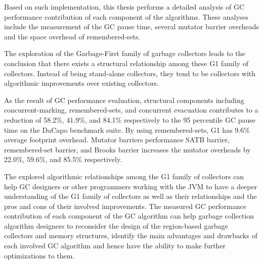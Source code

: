 Based on such implementation, this thesis performs a detailed
analysis of GC performance contribution of each component of the algorithms.
These analyses include the measurement of the GC pause time, several mutator barrier overheads
and the space overhead of remembered-sets.


The exploration of the Garbage-First family of garbage collectors leads to the conclusion
that there exists a structural relationship among these G1 family of collectors.
Instead of being stand-alone collectors, they tend to be collectors with
algorithmic improvements over existing collectors.

As the result of GC performance evaluation,
structural components including concurrent-marking, remembered-sets, and concurrent
evacuation contributes to a reduction of 58.2\%, 41.9\%, and 84.1\%
respectively to the 95 percentile GC pause time on the DaCapo benchmark suite.
By using remembered-sets, G1 has 9.6\% average footprint overhead.
Mutator barriers performance SATB barrier, remembered-set barrier,
and Brooks barrier increases the mutator overheads by 22.0\%, 59.6\%, and 85.5\%
respectively.


The explored algorithmic relationships among the G1 family of collectors can help
GC designers or other programmers working with the JVM to have a deeper understanding of
the G1 family of collectors as well as their relationships and the pros and cons of their involved improvements.
The measured GC performance contribution of each component of the GC algorithm
can help garbage collection algorithm designers to reconsider the design of 
the region-based garbage collectors and memory structures, identify
the main advantages and drawbacks of each involved GC algorithm and
hence have the ability to make further optimizations to them.

